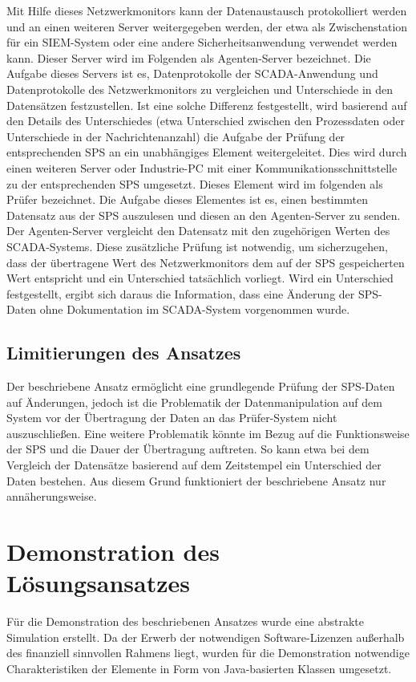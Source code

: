 Mit Hilfe dieses \glqq Netzwerkmonitors\grqq{} kann der Datenaustausch protokolliert werden und an einen weiteren Server weitergegeben werden, der etwa als Zwischenstation für ein SIEM-System oder eine andere Sicherheitsanwendung verwendet werden kann. Dieser Server wird im Folgenden als \glqq Agenten-Server\grqq{} bezeichnet. 
Die Aufgabe dieses Servers ist es, Datenprotokolle der SCADA-Anwendung und Datenprotokolle des Netzwerkmonitors zu vergleichen und Unterschiede in den Datensätzen festzustellen. Ist eine solche Differenz festgestellt, wird basierend auf den Details des Unterschiedes (etwa Unterschied zwischen den Prozessdaten oder Unterschiede in der Nachrichtenanzahl) die Aufgabe der Prüfung der entsprechenden SPS an ein unabhängiges Element weitergeleitet. 
Dies wird durch einen weiteren Server oder Industrie-PC mit einer Kommunikationsschnittstelle zu der entsprechenden SPS umgesetzt. Dieses Element wird im folgenden als \glqq Prüfer\grqq{} bezeichnet. Die Aufgabe dieses Elementes ist es, einen bestimmten Datensatz aus der SPS auszulesen und diesen an den Agenten-Server zu senden. 
Der Agenten-Server vergleicht den Datensatz mit den zugehörigen Werten des SCADA-Systems. Diese zusätzliche Prüfung ist notwendig, um sicherzugehen, dass der übertragene Wert des Netzwerkmonitors dem auf der SPS gespeicherten Wert entspricht und ein Unterschied tatsächlich vorliegt. Wird ein Unterschied festgestellt, ergibt sich daraus die Information, dass eine Änderung der SPS-Daten ohne Dokumentation im SCADA-System vorgenommen wurde.

\subsection{Limitierungen des Ansatzes}
Der beschriebene Ansatz ermöglicht eine grundlegende Prüfung der SPS-Daten auf Änderungen, jedoch ist die Problematik der Datenmanipulation auf dem System vor der Übertragung der Daten an das Prüfer-System nicht auszuschließen. Eine weitere Problematik könnte im Bezug auf die Funktionsweise der SPS und die Dauer der Übertragung auftreten. So kann etwa bei dem Vergleich der Datensätze basierend auf dem Zeitstempel ein Unterschied der Daten bestehen. Aus diesem Grund funktioniert der beschriebene Ansatz nur annäherungsweise.

\section{Demonstration des Lösungsansatzes}
Für die Demonstration des beschriebenen Ansatzes wurde eine abstrakte Simulation erstellt. Da der Erwerb der notwendigen Software-Lizenzen außerhalb des finanziell sinnvollen Rahmens liegt, wurden für die Demonstration notwendige Charakteristiken der Elemente in Form von Java-basierten Klassen umgesetzt.

